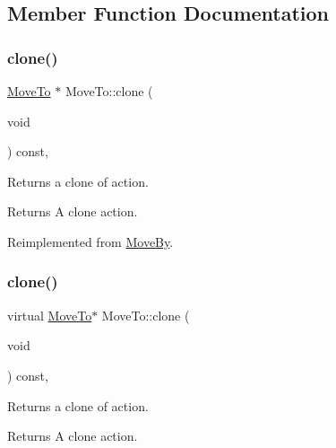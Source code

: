\subsection{Member Function Documentation}
\mbox{\label{classMoveTo_a0b5517ba663ab08cd69a51ba72b8e14c}} 
\subsubsection{\texorpdfstring{clone()}{clone()}\hspace{0.1cm}{\footnotesize\ttfamily [1/2]}}
{\footnotesize\ttfamily \hyperlink{classMoveTo}{Move\+To} $\ast$ Move\+To\+::clone (\begin{DoxyParamCaption}\item[{void}]{ }\end{DoxyParamCaption}) const\hspace{0.3cm}{\ttfamily [override]}, {\ttfamily [virtual]}}

Returns a clone of action.

\begin{DoxyReturn}{Returns}
A clone action. 
\end{DoxyReturn}


Reimplemented from \hyperlink{classMoveBy_a56e7a18b9eb4a9c106bac223103f937f}{Move\+By}.

\mbox{\label{classMoveTo_a9e164c0f1ef2a22a61377120e5463e60}} 
\subsubsection{\texorpdfstring{clone()}{clone()}\hspace{0.1cm}{\footnotesize\ttfamily [2/2]}}
{\footnotesize\ttfamily virtual \hyperlink{classMoveTo}{Move\+To}$\ast$ Move\+To\+::clone (\begin{DoxyParamCaption}\item[{void}]{ }\end{DoxyParamCaption}) const\hspace{0.3cm}{\ttfamily [override]}, {\ttfamily [virtual]}}

Returns a clone of action.

\begin{DoxyReturn}{Returns}
A clone action. 
\end{DoxyReturn}


